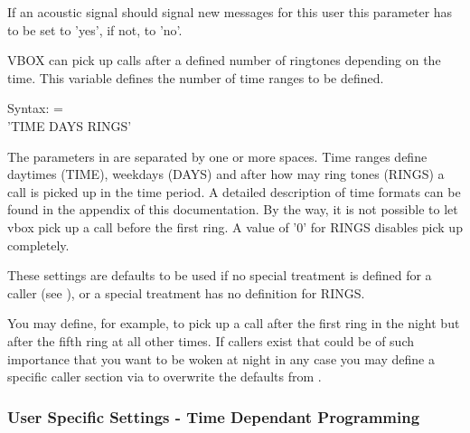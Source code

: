 \begin{description}
    If an acoustic signal should signal new messages for this user this parameter has
    to be set to 'yes', if not, to 'no'.
    


    VBOX can pick up calls after a defined number of ringtones depending on the time. This
    variable defines the number of time ranges to be defined.


    Syntax: =\\'TIME DAYS RINGS'

    The parameters in  are separated by one or more spaces.
    Time ranges define daytimes (TIME), weekdays (DAYS) and after how may ring tones (RINGS)
    a call is picked up in the time period. A detailed description of time formats can be found
    in the appendix of this documentation. By the way, it is not possible to let vbox pick up
    a call before the first ring. A value of '0' for RINGS disables pick up completely.

    These settings are defaults to be used if no special treatment is defined for a caller (see
    ), or a special treatment has no definition for RINGS.

    You may define, for example, to pick up a call after the first ring in the night but after
    the fifth ring at all other times. If callers exist that could be of such importance that
    you want to be woken at night in any case you may define a specific caller section via
     to overwrite the defaults from .
    
\end{description}

\subsubsection{User Specific Settings - Time Dependant Programming}


